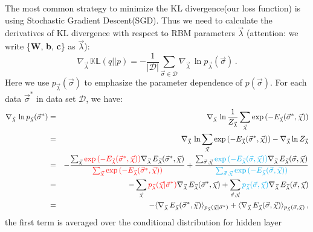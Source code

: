 \documentclass[letterpaper, 10pt]{article}
\newcommand{\qbar}{\rangle}
\newcommand{\qket}{\langle}
\begin{document}
The most common strategy to minimize the KL divergence(our loss function) is using Stochastic Gradient Descent(SGD). 
Thus we need to calculate the derivatives of KL divergence with respect to RBM parameters $ \vec{\lambda} $
(attention: we write \{\textbf{W}, \textbf{b}, \textbf{c}\} as $ \vec{\lambda} $):
\begin{equation}
\nabla_{\vec{\lambda}} \, \mathbb{KL}(q||p) = - \frac{1}{|\mathcal{D}|} 
\sum_{\vec{\sigma} \in \mathcal{D}} \nabla_{\vec{\lambda}} \, 
\ln{p_{\vec{\lambda}}(\vec{\sigma})}\,.\label{eq:eq10}
\end{equation}
Here we use $ p_{\vec{\lambda}}(\vec{\sigma}) $ to emphasize the parameter dependence of $ p(\vec{\sigma}) $. 
For each data $ \vec{\sigma}^* $ in data set $ \mathcal{D} $, we have:
\begin{eqnarray*}
\nabla_{\vec{\lambda}} \, \ln{p_{\vec{\lambda}}(\vec{\sigma}^*)}
& = & \nabla_{\vec{\lambda}} \, \ln \frac{1}{Z_{\vec{\lambda}}} 
\sum_{\vec{\chi}} \exp{( - E_{\vec{\lambda}}(\vec{\sigma}^*,\vec{\chi}) )} \\
& = & \nabla_{\vec{\lambda}} \, \ln \sum_{\vec{\chi}} 
\exp{( - E_{\vec{\lambda}}(\vec{\sigma}^*,\vec{\chi}) )} - 
\nabla_{\vec{\lambda}} \ln Z_{\vec{\lambda}} \\
& = & - \frac{\sum_{\vec{\chi}} {\color{red}{\exp{( - E_{\vec{\lambda}}(\vec{\sigma}^*,\vec{\chi}) )}}} 
\nabla_{\vec{\lambda}} \, E_{\vec{\lambda}}(\vec{\sigma}^*,\vec{\chi})}{ {\color{red}{\sum_{\vec{\chi}} 
\exp{( - E_{\vec{\lambda}}(\vec{\sigma}^*,\vec{\chi}) )}}} } + \frac{\sum_{\vec{\sigma},\vec{\chi}} 
{\color{cyan}{\exp{(-E_{\vec{\lambda}}(\vec{\sigma},\vec{\chi}))}}} 
\nabla_{\vec{\lambda}} \, E_{\vec{\lambda}}(\vec{\sigma},\vec{\chi})}{ {\color{cyan}{\sum_{\vec{\sigma},\vec{\chi}} 
\exp{(-E_{\vec{\lambda}}(\vec{\sigma},\vec{\chi}))}}} } \\
& = & - \sum_{\vec{\chi}} {\color{red}{p_{\vec{\lambda}}(\vec{\chi} | \vec{\sigma}^*)}} 
\nabla_{\vec{\lambda}} \, E_{\vec{\lambda}}(\vec{\sigma}^*,\vec{\chi}) + 
\sum_{\vec{\sigma},\vec{\chi}} {\color{cyan}{p_{\vec{\lambda}}(\vec{\sigma},\vec{\chi})}} 
\nabla_{\vec{\lambda}} \, E_{\vec{\lambda}}(\vec{\sigma},\vec{\chi}) \\
& = & - \qket \nabla_{\vec{\lambda}} \, 
E_{\vec{\lambda}}(\vec{\sigma}^*,\vec{\chi})\qbar_{p_{\vec{\lambda}}(\vec{\chi} | 
\vec{\sigma}^*)} + \qket\nabla_{\vec{\lambda}} \, 
E_{\vec{\lambda}}(\vec{\sigma},\vec{\chi})\qbar_{p_{\vec{\lambda}}(\vec{\sigma},\vec{\chi})}\,,
\end{eqnarray*}
the first term is averaged over the conditional distribution for hidden layer 
\end{document}
